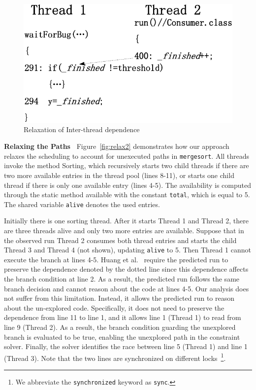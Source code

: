  

\begin{figure}[htp]
\centering
\includegraphics[scale=0.45]{figs/Visio-bbuffer.pdf}
\caption{Relaxation of Inter-thread dependence}\label{fig:relax1}
\end{figure}

{\bf Relaxing the Paths\ } Figure~\ref{fig:relax2} demonstrates how our 
approach relaxes the scheduling to account for  unexecuted paths in 
{\tt mergesort}. 
All threads invoke the method {\sf Sorting}, which recursively starts 
two child threads if there are two more available entries in the 
thread pool (lines 8-11), or starts one child thread if there is only 
one available entry (lines 4-5).  The availability is computed through 
the static method {\sf available} with the constant {\tt total}, which is equal to 5. The shared variable {\tt alive} denotes the used entries.

 
Initially there is one sorting thread. After it starts Thread 1 and 
Thread 2, there are three threads alive and only two more 
entries are available. Suppose that in the observed run Thread 2 
consumes both thread entries and starts the child Thread 3 
and Thread 4 (not shown), updating {\tt alive} to 5. Then Thread 1 
cannot execute the branch at lines 4-5. Huang et al.~\cite{pldi14} require the predicted run to preserve the dependence denoted by the dotted line since this dependence affects the branch condition at line 2. As a result, the predicted run follows the same branch decision and cannot reason about the code at lines 4-5. Our analysis does not suffer from this limitation. Instead, it allows the predicted run to reason about the un-explored code. Specifically, it does not need to preserve the dependence from line 11 to line 1, and it allows line 1 (Thread 1) to read from line 9 (Thread 2). As a result, the branch condition guarding the unexplored branch is evaluated to be true, enabling the unexplored path in the constraint solver. Finally, the solver identifies the race between line 5 (Thread 1) and line 1 (Thread 3). Note that the two lines are synchronized on different locks~\footnote{We abbreviate the {\tt synchronized} keyword as {\tt sync}.
}. 

